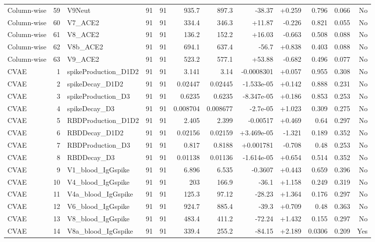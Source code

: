 \begin{landscape}
\begin{longtable}{@{}lrp{4.0cm}rrrrrrrrr@{}}
Column-wise & 59 & V9Neut & 91 & 91 & 935.7 & 897.3 & -38.37 & +0.259 & 0.796 & 0.066 & No \\
Column-wise & 60 & V7\_ACE2 & 91 & 91 & 334.4 & 346.3 & +11.87 & -0.226 & 0.821 & 0.055 & No \\
Column-wise & 61 & V8\_ACE2 & 91 & 91 & 136.2 & 152.2 & +16.03 & -0.663 & 0.508 & 0.088 & No \\
Column-wise & 62 & V8b\_ACE2 & 91 & 91 & 694.1 & 637.4 & -56.7 & +0.838 & 0.403 & 0.088 & No \\
Column-wise & 63 & V9\_ACE2 & 91 & 91 & 523.2 & 577.1 & +53.88 & -0.682 & 0.496 & 0.077 & No \\
CVAE & 1 & spikeProduction\_D1D2 & 91 & 91 & 3.141 & 3.14 & -0.0008301 & +0.057 & 0.955 & 0.308 & No \\
CVAE & 2 & spikeDecay\_D1D2 & 91 & 91 & 0.02447 & 0.02445 & -1.533e-05 & +0.142 & 0.888 & 0.231 & No \\
CVAE & 3 & spikeProduction\_D3 & 91 & 91 & 0.6235 & 0.6235 & -8.347e-05 & +0.186 & 0.853 & 0.253 & No \\
CVAE & 4 & spikeDecay\_D3 & 91 & 91 & 0.008704 & 0.008677 & -2.7e-05 & +1.023 & 0.309 & 0.275 & No \\
CVAE & 5 & RBDProduction\_D1D2 & 91 & 91 & 2.405 & 2.399 & -0.00517 & +0.469 & 0.64 & 0.297 & No \\
CVAE & 6 & RBDDecay\_D1D2 & 91 & 91 & 0.02156 & 0.02159 & +3.469e-05 & -1.321 & 0.189 & 0.352 & No \\
CVAE & 7 & RBDProduction\_D3 & 91 & 91 & 0.817 & 0.8188 & +0.001781 & -0.708 & 0.48 & 0.253 & No \\
CVAE & 8 & RBDDecay\_D3 & 91 & 91 & 0.01138 & 0.01136 & -1.614e-05 & +0.654 & 0.514 & 0.352 & No \\
CVAE & 9 & V1\_blood\_IgGspike & 91 & 91 & 6.896 & 6.535 & -0.3607 & +0.443 & 0.659 & 0.396 & No \\
CVAE & 10 & V4\_blood\_IgGspike & 91 & 91 & 203 & 166.9 & -36.1 & +1.158 & 0.249 & 0.319 & No \\
CVAE & 11 & V4a\_blood\_IgGspike & 91 & 91 & 125.3 & 97.12 & -28.23 & +1.364 & 0.176 & 0.297 & No \\
CVAE & 12 & V6\_blood\_IgGspike & 91 & 91 & 924.7 & 885.4 & -39.3 & +0.709 & 0.48 & 0.363 & No \\
CVAE & 13 & V8\_blood\_IgGspike & 91 & 91 & 483.4 & 411.2 & -72.24 & +1.432 & 0.155 & 0.297 & No \\
CVAE & 14 & V8a\_blood\_IgGspike & 91 & 91 & 339.4 & 255.2 & -84.15 & +2.189 & 0.0306 & 0.209 & Yes \\

\end{longtable}
\end{landscape}
